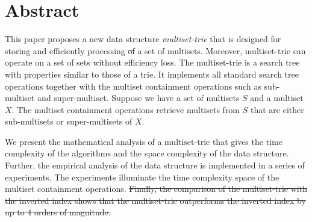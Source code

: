 \documentclass[10pt,letterpaper]{article}
\providecommand{\DIFdeltex}[1]{{\protect\color{red}\sout{#1}}}                      %
\providecommand{\DIFdelbegin}{} %
\providecommand{\DIFdelend}{} %
\providecommand{\DIFdel}[1]{\texorpdfstring{\DIFdeltex{#1}}{}} %
\newcommand{\DIFscaledelfig}{0.5}
\newlength{\DIFdelgraphicswidth} %
\newlength{\DIFdelgraphicsheight} %
\newcommand{\DIFdelincludegraphics}[2][]{%
\sbox{\DIFdelgraphicsbox}{\DIFOincludegraphics[#1]{#2}}%
\settoboxwidth{\DIFdelgraphicswidth}{\DIFdelgraphicsbox} %
\settoboxtotalheight{\DIFdelgraphicsheight}{\DIFdelgraphicsbox} %
\scalebox{\DIFscaledelfig}{%
\parbox[b]{\DIFdelgraphicswidth}{\usebox{\DIFdelgraphicsbox}\\[-\baselineskip] \rule{\DIFdelgraphicswidth}{0em}}\llap{\resizebox{\DIFdelgraphicswidth}{\DIFdelgraphicsheight}{%
\setlength{\unitlength}{\DIFdelgraphicswidth}%
\begin{picture}(1,1)%
\thicklines\linethickness{2pt} %
{\color[rgb]{1,0,0}\put(0,0){\framebox(1,1){}}}%
{\color[rgb]{1,0,0}\put(0,0){\line( 1,1){1}}}%
{\color[rgb]{1,0,0}\put(0,1){\line(1,-1){1}}}%
\end{picture}%
}\hspace*{3pt}}} %
} %
\DeclareRobustCommand{\DIFdelbegin}{\DIFOdelbegin \let\includegraphics\DIFdelincludegraphics} %
\DeclareRobustCommand{\DIFdelend}{\DIFOaddend \let\includegraphics\DIFOincludegraphics} %
\begin{document}
\section*{Abstract}
This paper proposes a new data structure \emph{multiset-trie} that is designed for storing and efficiently processing \DIFdelbegin \DIFdel{of }\DIFdelend a set of multisets. Moreover, multiset-trie can operate on a set of sets without efficiency loss.
%
The multiset-trie is a search tree with properties similar to those of a trie. It implements all standard search tree operations together with the multiset containment operations such as sub-multiset and super-multiset. Suppose we have a set of multisets $S$ and a multiset $X$. The multiset containment operations retrieve multisets from $S$ that are either sub-multisets or super-multisets of $X$. 

We present the mathematical analysis of a multiset-trie that gives the time complexity of the algorithms and the space complexity of the data structure. Further, the empirical analysis of the data structure is implemented in a series of experiments. The experiments illuminate the time complexity space of the multiset containment operations.
\DIFdelbegin \DIFdel{Finally, the comparison of the multiset-trie with the inverted index shows that the multiset-trie outperforms the inverted index by up to 4 orders of magnitude.
}\DIFdelend %

\newpage
\tableofcontents


\end{document}
